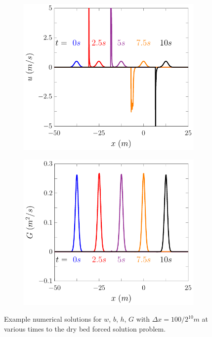 \documentclass[times]{elsarticle}
\begin{document}
\begin{figure}
\begin{subfigure}{0.5\textwidth}
		\vspace{0.5cm}
	\end{subfigure}
	\begin{subfigure}{0.5\textwidth}
\includegraphics[width=\textwidth]{./Figures/Forced/Dry/u.pdf}
		\vspace{0.5cm}
	\end{subfigure}%
	\begin{subfigure}{0.5\textwidth}
\includegraphics[width=\textwidth]{./Figures/Forced/Dry/G.pdf}
		\vspace{0.5cm}
	\end{subfigure}
	\caption{Example numerical solutions for $w$, $b$, $h$, $G$ with $\Delta x = 100 / 2^{10}m$ at various times to the dry bed forced solution problem.}
	\label{fig:ExampleForcedSolutionDry}
\end{figure}
\end{document}
